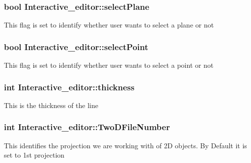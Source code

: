 \subsubsection[{\texorpdfstring{select\+Plane}{selectPlane}}]{\setlength{\rightskip}{0pt plus 5cm}bool Interactive\+\_\+editor\+::select\+Plane}\hypertarget{classInteractive__editor_a9da61abe038ee33f9d15ef4a028dc8ab}{}\label{classInteractive__editor_a9da61abe038ee33f9d15ef4a028dc8ab}
This flag is set to identify whether user wants to select a plane or not 
\subsubsection[{\texorpdfstring{select\+Point}{selectPoint}}]{\setlength{\rightskip}{0pt plus 5cm}bool Interactive\+\_\+editor\+::select\+Point}\hypertarget{classInteractive__editor_ab0f07759c3ff1bcfe45d0c285abe29b5}{}\label{classInteractive__editor_ab0f07759c3ff1bcfe45d0c285abe29b5}
This flag is set to identify whether user wants to select a point or not 
\subsubsection[{\texorpdfstring{thickness}{thickness}}]{\setlength{\rightskip}{0pt plus 5cm}int Interactive\+\_\+editor\+::thickness}\hypertarget{classInteractive__editor_a65f9bb481055109e9d52e2a6bc2db58e}{}\label{classInteractive__editor_a65f9bb481055109e9d52e2a6bc2db58e}
This is the thickness of the line 
\subsubsection[{\texorpdfstring{Two\+D\+File\+Number}{TwoDFileNumber}}]{\setlength{\rightskip}{0pt plus 5cm}int Interactive\+\_\+editor\+::\+Two\+D\+File\+Number}\hypertarget{classInteractive__editor_a016e5e8e9a124977ab6048c90980be97}{}\label{classInteractive__editor_a016e5e8e9a124977ab6048c90980be97}
This identifies the projection we are working with of 2D objects. By Default it is set to 1st projection 
